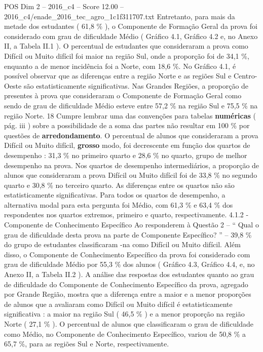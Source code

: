 \begin{textsample}{POS Dim 2 – 2016\_c4 – Score 12.00 – 2016\_c4/enade\_2016\_tec\_agro\_1c1f311707.txt}
Entretanto, para mais da metade dos estudantes ( 61,8 \% ), o Componente de Formação Geral da prova foi considerado com grau de dificuldade Médio ( Gráfico 4.1, Gráfico 4.2 e, no Anexo II, a Tabela II.1 ).
O percentual de estudantes que consideraram a prova como Difícil ou Muito difícil foi maior na região Sul, onde a proporção foi de 34,1 \%, enquanto a de menor incidência foi a Norte, com 18,6 \%.
No Gráfico 4.1, é possível observar que as diferenças entre a região Norte e as regiões Sul e Centro-Oeste são estatisticamente significativas.
Nas Grandes Regiões, a proporção de presentes à prova que consideraram o Componente de Formação Geral como sendo de grau de dificuldade Médio esteve entre 57,2 \% na região Sul e 75,5 \% na região Norte. 18 Cumpre lembrar uma das convenções para tabelas \textbf{numéricas} ( pág. iii ) sobre a possibilidade de a soma das partes não resultar em 100 \% por questões de \textbf{arredondamento}.
O percentual de alunos que consideraram a prova Difícil ou Muito difícil, \textbf{grosso} modo, foi decrescente em função dos quartos de desempenho : 31,3 \% no primeiro quarto e 28,6 \% no quarto, grupo de melhor desempenho na prova.
Nos quartos de desempenho intermediários, a proporção de alunos que consideraram a prova Difícil ou Muito difícil foi de 33,8 \% no segundo quarto e 30,8 \% no terceiro quarto.
As diferenças entre os quartos não são estatisticamente significativas.
Para todos os quartos de desempenho, a alternativa modal para esta pergunta foi Médio, com 61,3 \% e 63,4 \% dos respondentes nos quartos extremos, primeiro e quarto, respectivamente. 4.1.2 - Componente de Conhecimento Específico Ao responderem à Questão 2 – “ Qual o grau de dificuldade desta prova na parte de Componente Específico? ” – 39,8 \% do grupo de estudantes classificaram -na como Difícil ou Muito difícil.
Além disso, o Componente de Conhecimento Específico da prova foi considerado com grau de dificuldade Médio por 55,3 \% dos alunos ( Gráfico 4.3, Gráfico 4.4, e, no Anexo II, a Tabela II.2 ).
A análise das respostas dos estudantes quanto ao grau de dificuldade do Componente de Conhecimento Específico da prova, agregado por Grande Região, mostra que a diferença entre a maior e a menor proporções de alunos que a avaliaram como Difícil ou Muito difícil é estatisticamente significativa : a maior na região Sul ( 46,5 \% ) e a menor proporção na região Norte ( 27,1 \% ).
O percentual de alunos que classificaram o grau de dificuldade como Médio, no Componente de Conhecimento Específico, variou de 50,8 \% a 65,7 \%, para as regiões Sul e Norte, respectivamente.

\end{textsample}
